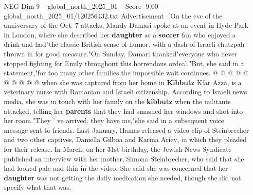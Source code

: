 \begin{textsample}{NEG Dim 9 – global\_north\_2025\_01 – Score -9.00 – global\_north\_2025\_01/120256432.txt}
Advertisement : On the eve of the anniversary of the Oct. 7 attacks, Mandy Damari spoke at an event in Hyde Park in London, where she described her \textbf{daughter} as a \textbf{soccer} fan who enjoyed a drink and had"the classic British sense of humor, with a dash of Israeli chutzpah thrown in for good measure."On Sunday, Damari thanked"everyone who never stopped fighting for Emily throughout this horrendous ordeal."But, she said in a statement,"for too many other families the impossible wait continues. @ @ @ @ @ @ @ @ @ @ when she was captured from her home in \textbf{Kibbutz} Kfar Azza, is a veterinary nurse with Romanian and Israeli citizenship.
According to Israeli news media, she was in touch with her family on the \textbf{kibbutz} when the militants attacked, telling her \textbf{parents} that they had smashed her windows and shot into her room."They ' ve arrived, they have me,"she said in a subsequent voice message sent to friends.
Last January, Hamas released a video clip of Steinbrecher and two other captives, Daniella Gilboa and Karina Ariev, in which they pleaded for their release.
In March, on her 31st birthday, the Jewish News Syndicate published an interview with her mother, Simona Steinbrecher, who said that she had looked pale and thin in the video.
She said she was concerned that her \textbf{daughter} was not getting the daily medication she needed, though she did not specify what that was.

\end{textsample}
